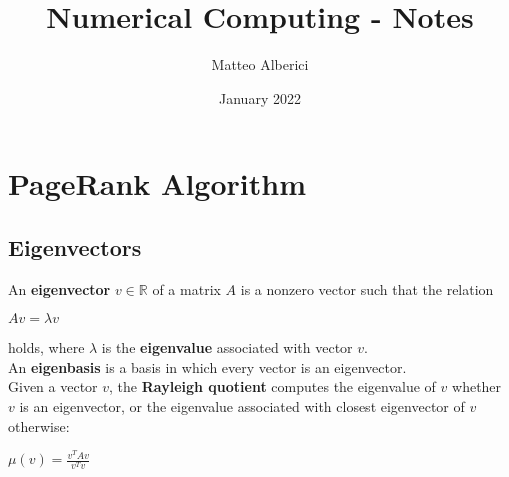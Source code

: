 \documentclass{article}
\title{Numerical Computing - Notes}
\author{Matteo Alberici}
\date{January 2022}
\begin{document}
\maketitle
\newpage
\tableofcontents
\newpage

\section{PageRank Algorithm}
\subsection{Eigenvectors}
An \textbf{eigenvector} $v \in \mathbb{R}$ of a matrix $A$ is a nonzero vector such that the relation
\begin{center}
    $Av = \lambda v$ 
\end{center}
holds, where $\lambda$ is the \textbf{eigenvalue} associated with vector $v$. \\
An \textbf{eigenbasis} is a basis in which every vector is an eigenvector. \\
Given a vector $v$, the \textbf{Rayleigh quotient} computes the eigenvalue of $v$ whether $v$ is an eigenvector, or the eigenvalue associated with closest eigenvector of $v$ otherwise:
\begin{center}
    $\mu(v) = \displaystyle\frac{v^TAv}{v^Tv}$
\end{center}
\end{document}
